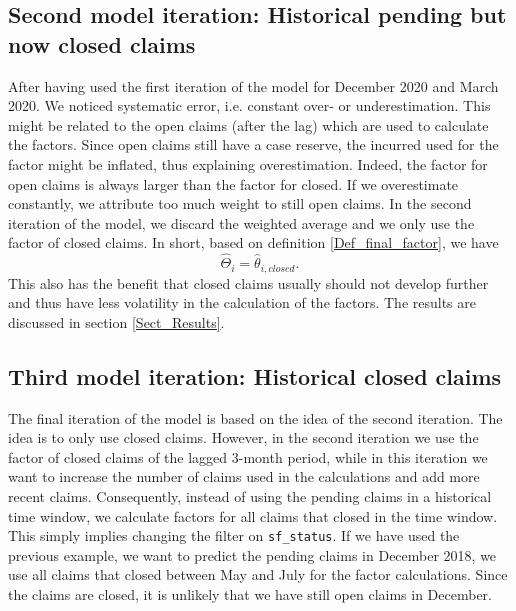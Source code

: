 \subsection{Second model iteration: Historical pending but now closed claims}
After having used the first iteration of the model for December 2020 and March 2020. We noticed systematic error, i.e. constant over- or underestimation. This might be related to the open claims (after the lag) which are used to calculate the factors. Since open claims still have a case reserve, the incurred used for the factor might be inflated, thus explaining overestimation. Indeed, the factor for open claims is always larger than the factor for closed. If we overestimate constantly, we attribute too much weight to still open claims. In the second iteration of the model, we discard the weighted average and we only use the factor of closed claims. In short, based on definition \ref{Def_final_factor}, we have
$$\hat{\Theta}_i = \hat{\theta}_{i,closed}.$$
This also has the benefit that closed claims usually should not develop further and thus have less volatility in the calculation of the factors. The results are discussed in section \ref{Sect_Results}.
\subsection{Third model iteration: Historical closed claims}
The final iteration of the model is based on the idea of the second iteration. The idea is to only use closed claims. However, in the second iteration we use the factor of closed claims of the lagged 3-month period, while in this iteration we want to increase the number of claims used in the calculations and add more recent claims. Consequently, instead of using the pending claims in a historical time window, we calculate factors for all claims that closed in the time window. This simply implies changing the filter on \texttt{sf\_status}. If we have used the previous example, we want to predict the pending claims in December 2018, we use all claims that closed between May and July for the factor calculations. Since the claims are closed, it is unlikely that we have still open claims in December.
